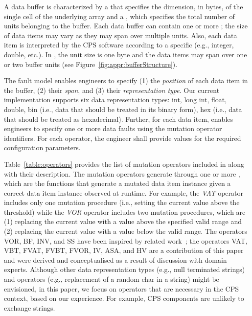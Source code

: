 A data buffer is characterized by a  that specifies the dimension, in bytes, of the single cell of the underlying array and a , which specifies the total number of units belonging to the buffer. Each data buffer can contain one or more ; the size of data items may vary as they may span over multiple units. Also, each data item is interpreted by the CPS software according to a specific  (e.g., integer, double, etc.).
In \ESAIL, the unit size is one byte and the data items may span over one or two buffer units (see Figure~\ref{fig:appr:bufferStructure}).

The \APPR fault model enables engineers to specify (1) the \emph{position} of each data item in the buffer, (2) their \emph{span}, and (3) their \emph{representation type}. Our current implementation supports six data representation types: int, long int, float, double, bin (i.e., data that should be treated in its binary form), hex (i.e., data that should be treated as hexadecimal).
Further, for each data item, \APPR enables engineers to specify one or more data faults using the mutation operator identifiers. For each operator, the engineer
shall provide values for the required configuration parameters.

Table~\ref{table:operators} provides the list of mutation operators included in \APPR along with their description. The \APPR mutation operators generate  through one or more , which are the functions that generate a mutated data item instance given a correct data item instance observed at runtime. For example, the \emph{VAT} operator includes only one mutation procedure (i.e., setting the current value above the threshold) while the \emph{VOR} operator includes two mutation procedures, which are
(1) replacing the current value with a value above the specified valid range and (2) replacing the current value with a value below the valid range.
The operators VOR, BF, INV, and SS have been inspired by related work~\cite{di2015generating,PeachFuzzer,Matinnejad19}; the operators VAT, VBT, FVAT, FVBT, FVOR, IV, ASA,  and HV
are a contribution of this paper and were derived and conceptualised as a result of discussion with domain experts.
Although other data representation types (e.g., null terminated strings) and operators (e.g., replacement of a random char in a string) might be envisioned, in this paper, we focus on operators that are necessary in the CPS context, based on our experience.
For example, CPS components are unlikely to exchange strings.


